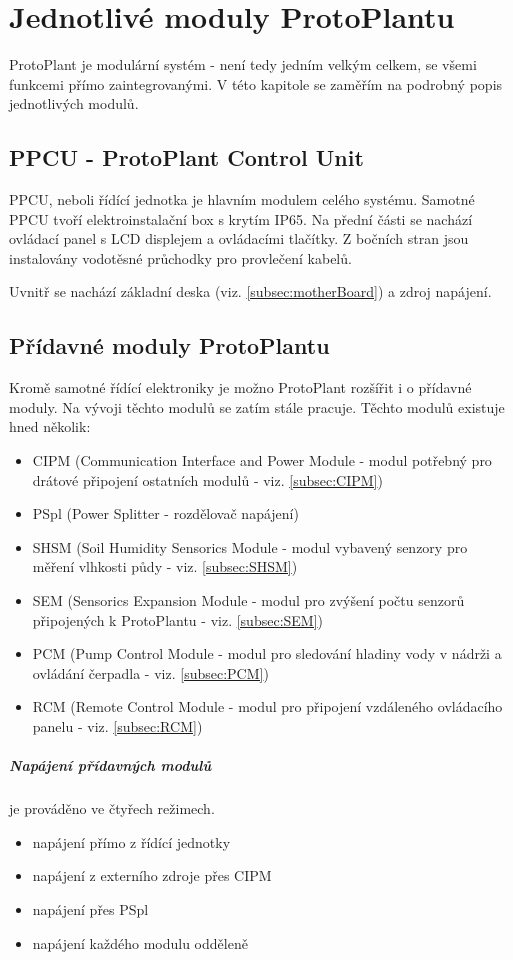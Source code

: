\chapter{Jednotlivé moduly ProtoPlantu}
ProtoPlant je modulární systém - není tedy jedním velkým celkem, se všemi funkcemi přímo zaintegrovanými.
V této kapitole se zaměřím na podrobný popis jednotlivých modulů.
\section{PPCU - ProtoPlant Control Unit}
PPCU, neboli řídící jednotka je hlavním modulem celého systému.
Samotné PPCU tvoří elektroinstalační box s krytím IP65.
Na přední části se nachází ovládací panel s LCD displejem a ovládacími tlačítky.
Z bočních stran jsou instalovány vodotěsné průchodky pro provlečení kabelů.

Uvnitř se nachází základní deska (viz. \autoref{subsec:motherBoard}) a zdroj napájení.

\section{Přídavné moduly ProtoPlantu}
Kromě samotné řídící elektroniky je možno ProtoPlant rozšířit i o přídavné moduly. 
Na vývoji těchto modulů se zatím stále pracuje.
Těchto modulů existuje hned několik:

\begin{itemize}
    \item CIPM (Communication Interface and Power Module  - modul potřebný pro drátové připojení ostatních modulů - viz. \autoref{subsec:CIPM})
    \item PSpl (Power Splitter - rozdělovač napájení)
    \item SHSM (Soil Humidity Sensorics Module - modul vybavený senzory pro měření vlhkosti půdy - viz. \autoref{subsec:SHSM})
    \item SEM (Sensorics Expansion Module - modul pro zvýšení počtu senzorů připojených k ProtoPlantu - viz. \autoref{subsec:SEM})
    \item PCM (Pump Control Module - modul pro sledování hladiny vody v nádrži a ovládání čerpadla - viz. \autoref{subsec:PCM})
    \item RCM (Remote Control Module - modul pro připojení vzdáleného ovládacího panelu - viz. \autoref{subsec:RCM})
\end{itemize}

\paragraph{Napájení přídavných modulů}
je prováděno ve čtyřech režimech.
\begin{itemize}
    \item napájení přímo z řídící jednotky
    \item napájení z externího zdroje přes CIPM
    \item napájení přes PSpl
    \item napájení každého modulu odděleně
\end{itemize}

